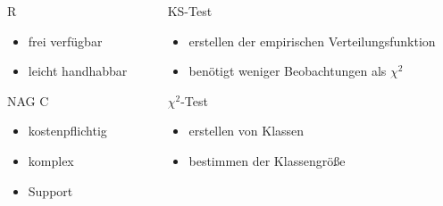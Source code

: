 \documentclass{beamer}
\begin{document}
\begin{frame}{\insertsection}

\begin{columns}
\begin{column}{.48\textwidth}
\begin{block}{R}
	\begin{itemize}
		\item frei verfügbar
		\item leicht handhabbar
	\end{itemize}
\end{block}
\vspace{1cm}

\begin{block}{NAG C}
	\begin{itemize}
		\item kostenpflichtig
		\item komplex
		\item Support
	\end{itemize}
\end{block}
\end{column}

\hfill
\begin{column}{.48\textwidth}
\begin{block}{KS-Test}
	\begin{itemize}
		\item erstellen der empirischen Verteilungsfunktion
		\item benötigt weniger Beobachtungen als $\chi^2$
	\end{itemize}
\end{block}
\begin{block}{$\chi^2$-Test}
	\begin{itemize}		
		\item erstellen von Klassen
		\item bestimmen der Klassengröße
	\end{itemize}
\end{block}
\end{column}
\end{columns}




\end{frame}
\end{document}
